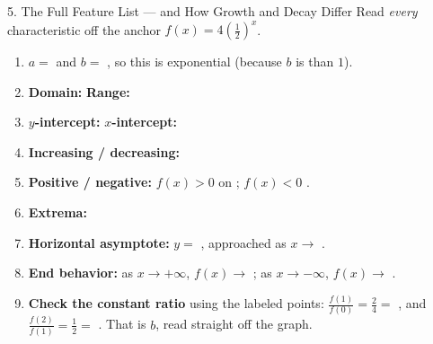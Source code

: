 \documentclass[10pt]{article}
\newcommand{\lgrid}[4]{%
  \draw[step=1, linegray!40, very thin] (#1,#3) grid (#2,#4);
  \draw[->, semithick, charcoal] (#1,0)--(#2,0) node[below right, font=\scriptsize]{$x$};
  \draw[->, semithick, charcoal] (0,#3)--(0,#4) node[left, font=\scriptsize]{$y$};}
\newcommand{\expcurve}[4]{\draw[very thick, forest, domain=#3:#4, samples=120, smooth]
  plot (\x,{#1*exp((#2)*(\x))});}
\begin{document}
\begin{notesbox}{5. The Full Feature List --- and How Growth and Decay Differ}
Read \emph{every} characteristic off the anchor $f(x)=4\left(\frac12\right)^{x}$.
\begin{center}
\end{center}
\begin{enumerate}[leftmargin=1.7em, itemsep=3pt]
  \item $a=$ \blank{0.9cm} and $b=$ \blank{0.9cm}, so this is exponential \blank{1.8cm}
        (because $b$ is \blank{1.6cm} than $1$).
  \item \textbf{Domain:} \blank{3.2cm} \quad \textbf{Range:} \blank{3.2cm}
  \item \textbf{$y$-intercept:} \blank{1.8cm} \quad \textbf{$x$-intercept:} \blank{1.8cm}
  \item \textbf{Increasing / decreasing:} \blank{3.2cm}
  \item \textbf{Positive / negative:} $f(x)>0$ on \blank{2.8cm}; \quad $f(x)<0$ \blank{2.2cm}.
  \item \textbf{Extrema:} \blank{3.4cm}
  \item \textbf{Horizontal asymptote:} $y=$ \blank{1.0cm}, approached as $x\to$ \blank{1.4cm}.
  \item \textbf{End behavior:} as $x\to+\infty$, $f(x)\to$ \blank{1.2cm}; \; as $x\to-\infty$,
        $f(x)\to$ \blank{1.2cm}.
  \item \textbf{Check the constant ratio} using the labeled points: $\frac{f(1)}{f(0)}=\frac{2}{4}=$
        \blank{1.0cm}, and $\frac{f(2)}{f(1)}=\frac{1}{2}=$ \blank{1.0cm}. That is $b$, read
        straight off the graph.
\end{enumerate}


\end{notesbox}
\end{document}
